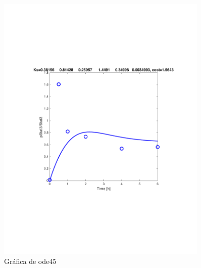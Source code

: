 \documentclass[a4paper,12pt]{article}
\begin{document}
\begin{figure}
\centering
\includegraphics[width = 0.9\textwidth,trim =  {0 7.5cm 0 7.5 cm}, clip]{mifigura.pdf}
\caption{Gráfica de ode45}
\end{figure}
\end{document}
